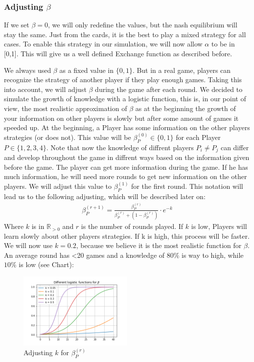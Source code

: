 \subsubsection{Adjusting $\beta$}

If we set $\beta = 0$, we will only redefine the values, but the nash equilibrium will stay the same. Just from the cards, it is the best to play a mixed strategy for all cases. To enable this strategy in our simulation, we will now allow $\alpha$ to be in [0,1]. This will give us a well defined Exchange function as described before.

We always used $\beta$ as a fixed value in $\{0,1\}$. But in a real game, players can recognize the strategy of another player if they play enough games. Taking this into account, we will adjust $\beta$ during the game after each round. We decided to simulate the growth of knowledge with a logistic function, this is, in our point of view, the most realistic approximation of $\beta$ as at the beginning the growth of your information on other players is slowly but after some amount of games it speeded up. At the beginning, a Player has some information on the other players strategies (or does not). This value will be $\beta^{(0)}_{P}\in\{0,1\}$ for each Player $P\in\{1,2,3,4\}$. Note that now the knowledge of diffrent players $P_i\neq P_j$ can differ and develop throughout the game in diffrent ways based on the information given before the game. The player can get more information during the game. If he has much information, he will need more rounds to get new information on the other players. We will adjust this value to $\beta^{(1)}_{P}$ for the first round. This notation will lead us to the following adjusting, which will be described later on:
\begin{align*}
\beta^{(r+1)}_{P} = \frac{\beta^{(r)}_{P}
}{\beta^{(r)}_{P} + (1 - \beta^{(r)}_{P})} \cdot e^{-k}
\end{align*}
Where $k$ is in $\mathbb{R}_{>0}$ and $r$ is the number of rounds played. If $k$ is low, Players will learn slowly about other players strategies. If k is high, this process will be faster. We will now use $k = 0.2$, because we believe it is the most realistic function for $\beta$. An average round has <20 games and a knowledge of $80\%$ is way to high, while $10\%$ is low (see Chart):

\begin{figure}[h!]
    \centering
    \includegraphics[width=0.5\textwidth]{Bilder/5_log}
    \caption{Adjusting $k$ for $\beta^{(r)}_{P}$}
    \label{fig:meine-grafik}
\end{figure}

